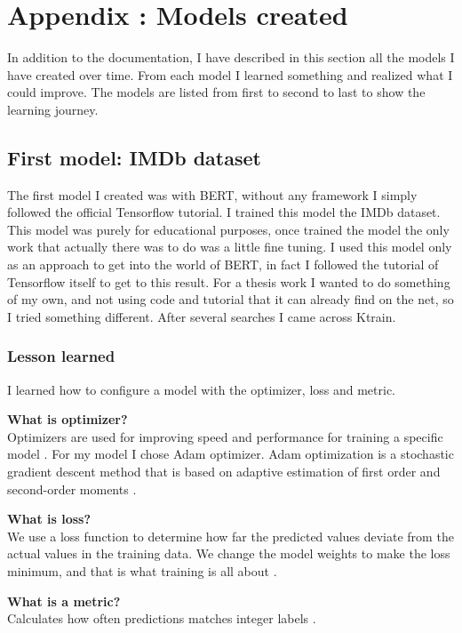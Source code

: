 \section{Appendix : Models created}
In addition to the documentation, I have described in this section all the models I have created over time.
From each model I learned something and realized what I could improve.
The models are listed from first to second to last to show the learning journey.

\subsection{First model: IMDb dataset}
The first model I created was with \gls{BERT}, without any framework I simply followed the official \gls{Tensorflow} tutorial.
I trained this model the IMDb dataset.
This model was purely for educational purposes, once trained the model the only work that actually there was to do was a little fine tuning.
I used this model only as an approach to get into the world of \gls{BERT}, in fact I followed the tutorial of \gls{Tensorflow} itself to get to this result.
For a thesis work I wanted to do something of my own, and not using code and tutorial that it can already find on the net, so I tried something different.
After several searches I came across \gls{Ktrain}.

\subsubsection{Lesson learned}
I learned how to configure a model with the optimizer, loss and metric.

\textbf{What is optimizer?}\\
Optimizers are used for improving speed and performance for training a specific model \cite{noauthor_tensorflow_nodate_optimizer}. 
For my model I chose Adam optimizer. Adam optimization is a stochastic gradient descent method that is based on adaptive estimation of first order and second-order moments \cite{noauthor_tfkerasoptimizersadam_nodate}.

\textbf{What is loss?}\\
 We use a loss function to determine how far the predicted values deviate from the actual values in the training data. We change the model weights to make the loss minimum, and that is what training is all about \cite{patnaik_loss_2018}.
 
\textbf{What is a metric?}\\Calculates how often predictions matches integer labels \cite{noauthor_tfkerasmetricssparsecategoricalaccuracy_nodate}.

